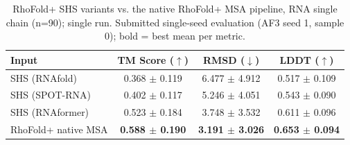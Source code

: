 \begin{table}[htbp]
\centering
\caption{RhoFold+ SHS variants vs. the native RhoFold+ MSA pipeline, RNA single chain (n=90); single run. Submitted single-seed evaluation (AF3 seed 1, sample 0); bold = best mean per metric.}
\label{tab:rf_rna_single_chain_native_msa}
\begin{tabular}{lccc}
\toprule
Input & TM Score ($\uparrow$) & RMSD ($\downarrow$) & LDDT ($\uparrow$) \\
\midrule
SHS (RNAfold) & 0.368 $\pm$ 0.119 & 6.477 $\pm$ 4.912 & 0.517 $\pm$ 0.109 \\
SHS (SPOT-RNA) & 0.402 $\pm$ 0.117 & 5.246 $\pm$ 4.051 & 0.543 $\pm$ 0.090 \\
SHS (RNAformer) & 0.523 $\pm$ 0.184 & 3.748 $\pm$ 3.532 & 0.611 $\pm$ 0.096 \\
RhoFold+ native MSA & \textbf{0.588 $\pm$ 0.190} & \textbf{3.191 $\pm$ 3.026} & \textbf{0.653 $\pm$ 0.094} \\
\bottomrule
\end{tabular}
\end{table}
